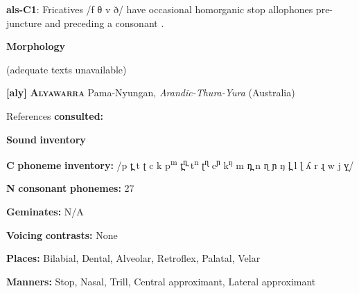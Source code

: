 \begin{styleBody}
\textbf{als-C1}: Fricatives /f θ v ð/ have occasional homorganic stop allophones pre-juncture and preceding a consonant \citep{Newmark1957}.
\end{styleBody}

\begin{styleBody}
\textbf{Morphology}
\end{styleBody}

\begin{styleBody}
(adequate texts unavailable)
\end{styleBody}

\begin{styleBody}
\textbf{[aly]}   \textbf{\textsc{Alyawarra}}  Pama-Nyungan, \textit{Arandic-Thura-Yura} (Australia)
\end{styleBody}

\begin{styleBody}
References \textbf{consulted:} \citet{Yallop1977}
\end{styleBody}

\begin{styleBody}
\textbf{Sound} \textbf{inventory}
\end{styleBody}

\begin{styleBody}
\textbf{C} \textbf{phoneme} \textbf{inventory:} /p t̪ t ʈ c k p\textsuperscript{m} t̪\textsuperscript{n̪} t\textsuperscript{n} ʈ\textsuperscript{ɳ} c\textsuperscript{ɲ} k\textsuperscript{ŋ} m n̪ n ɳ ɲ ŋ l̪ l ɭ ʎ r ɻ w j ɣ̞/
\end{styleBody}

\begin{styleBody}
\textbf{N} \textbf{consonant} \textbf{phonemes:} 27
\end{styleBody}

\begin{styleBody}
\textbf{Geminates:} N/A
\end{styleBody}

\begin{styleBody}
\textbf{Voicing} \textbf{contrasts:} None
\end{styleBody}

\begin{styleBody}
\textbf{Places:} Bilabial, Dental, Alveolar, Retroflex, Palatal, Velar
\end{styleBody}

\begin{styleBody}
\textbf{Manners:} Stop, Nasal, Trill, Central approximant, Lateral approximant
\end{styleBody}

